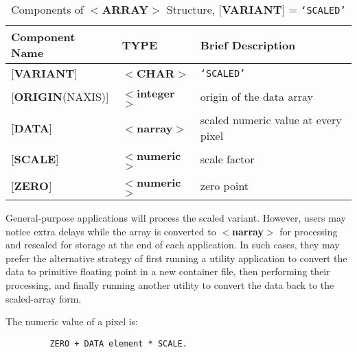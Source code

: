 \documentclass[twoside,11pt]{article}
\renewcommand{\_}{\texttt{\symbol{95}}}
\begin{document}
\begin{table}[htb]
\centering
\caption{Components of $<${\bf ARRAY}$>$ Structure, {[}{\bf VARIANT}{]} = {\tt `SCALED'}}
\begin{tabular}{|l|l|l|}
\hline
Component Name & TYPE & Brief Description \\ \hline
{[}{\bf VARIANT}{]} & $<${\bf \_CHAR}$>$ & {\tt `SCALED'} \\
{[}{\bf ORIGIN}(NAXIS){]} & $<${\bf integer}$>$ & origin of the data array \\
{[}{\bf DATA}{]} & $<${\bf narray}$>$ & scaled numeric value at every pixel \\
{[}{\bf SCALE}{]} & $<${\bf numeric}$>$ & scale factor \\
{[}{\bf ZERO}{]} & $<${\bf numeric}$>$ & zero point \\ \hline
\end{tabular}
\end{table}

General-purpose applications will process the scaled variant.
However, users may notice extra delays
while the array is converted to
$<${\bf narray}$>$ for processing
and rescaled for storage at the end of each application.  In such cases,
they may prefer the
alternative strategy of first running a utility application
to convert the data to primitive floating point in a new
container file, then performing their processing, and
finally running another utility to convert
the data back to the scaled-array
form.

The numeric value of a pixel is:
\begin{verbatim}
         ZERO + DATA element * SCALE.
\end{verbatim}
\end{document}
